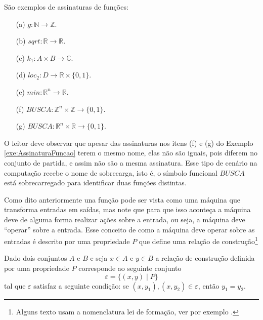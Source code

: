 \begin{example}\label{exe:AssinaturaFuncao}
	São exemplos de assinaturas de funções:
	\begin{itemize}
		\item[(a)] $g : \mathbb{N} \rightarrow \mathbb{Z}$.
		\item[(b)] $sqrt : \mathbb{R} \rightarrow \mathbb{R}$.
		\item[(c)] $k_1 : A \times B \rightarrow \mathbb{C}$.
		\item[(d)] $loc_2 : D \rightarrow \mathbb{R} \times \{0,1\}$.
		\item[(e)] $min : \mathbb{R}^n \rightarrow \mathbb{R}$.
		\item[(f)] $BUSCA : \mathbb{Z}^n \times \mathbb{Z} \rightarrow \{0,1\}$.
		\item[(g)] $BUSCA : \mathbb{R}^n \times \mathbb{R} \rightarrow \{0,1\}$.
	\end{itemize}
\end{example}

\begin{remark}
	O leitor deve observar que apesar das assinaturas nos itens (f) e (g) do Exemplo \ref{exe:AssinaturaFuncao} terem o mesmo nome, elas não são iguais, pois diferem no conjunto de partida, e assim não são a mesma assinatura. Esse tipo de cenário na computação recebe o nome de sobrecarga, isto é, o símbolo funcional $BUSCA$ está sobrecarregado para identificar duas funções distintas.
\end{remark}

Como dito anteriormente una função pode ser vista como uma máquina que transforma entradas em saídas, mas note que para que isso aconteça a máquina deve de alguma forma realizar ações sobre a entrada, ou seja, a máquina deve ``operar'' sobre a entrada. Esse conceito de como a máquina deve operar sobre as entradas é descrito por uma propriedade $P$ que define uma relação de construção\footnote{Alguns texto usam a nomenclatura lei de formação, ver por exemplo \cite{carmo2013}.}

\begin{definition}\label{def:RelacaoConstrucao}
	Dado dois conjuntos $A$ e $B$ e seja $x \in A$ e $y \in B$ a relação de construção definida por uma propriedade $P$ corresponde  ao seguinte conjunto 
	$$\varepsilon = \{(x, y)\mid P\}$$ tal que $\varepsilon$ satisfaz a seguinte condição: se $(x, y_1), (x, y_2) \in \varepsilon$, então $y_1 = y_2$.
\end{definition}

